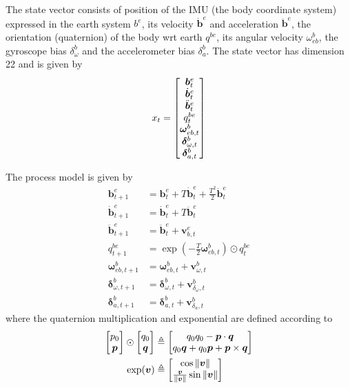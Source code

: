 The state vector consists of position of the IMU (the body coordinate system) expressed in the earth system $ b^{e} $, its velocity $ \dot{\bm{b}}^{e} $ and acceleration $ \ddot{\bm{b}}^{e} $, the orientation (quaternion) of the body wrt earth $ q^{be} $, its angular velocity $ \omega_{eb}^{b} $, the gyroscope bias $ \delta_{\omega}^{b} $ and the accelerometer bias $ \delta_{a}^{b} $. The state vector has dimension 22 and is given by
\begin{equation}\label{eq:state1}
x_{t} = \begin{bmatrix} \bm{b}_{t}^{e} \\ \dot{\bm{b}}_{t}^{e} \\ \ddot{\bm{b}}_{t}^{e} \\ q_{t}^{be} \\ \bm{\omega}_{eb,t}^{b} \\ \bm{\delta}_{\omega,t}^{b} \\ \bm{\delta}_{a,t}^{b} \end{bmatrix}
\end{equation}

The process model is given by
\begin{subequations}\label{eq:procmod1} \begin{align}
	\bm{b}_{t+1}^{e} &= \bm{b}_{t}^{e} + T \dot{\bm{b}}_{t}^{e} + \tfrac {T^{2}} {2} \ddot{\bm{b}}_{t}^{e} \\
	\dot{\bm{b}}_{t+1}^{e} &= \dot{\bm{b}}_{t}^{e} + T \ddot{\bm{b}}_{t}^{e} \\
	\ddot{\bm{b}}_{t+1}^{e} &= \ddot{\bm{b}}_{t}^{e} + \bm{v}_{b,t}^{e} \\
	q_{t+1}^{be} &= \exp( -\tfrac{T}{2} \bm{\omega}_{eb,t}^{b} ) \odot q_{t}^{be} \\
	\bm{\omega}_{eb,t+1}^{b} &= \bm{\omega}_{eb,t}^{b} + \bm{v}_{\omega,t}^{b} \\
	\bm{\delta}_{\omega,t+1}^{b} &= \bm{\delta}_{\omega,t}^{b} + \bm{v}_{\delta_{\omega},t}^{b} \\
	\bm{\delta}_{a,t+1}^{b} &= \bm{\delta}_{a,t}^{b} + \bm{v}_{\delta_{a},t}^{b}
\end{align} \end{subequations}
where the quaternion multiplication and exponential are defined according to
\begin{subequations} \begin{align}
	\begin{bmatrix} p_{0} \\ \bm{p} \end{bmatrix} \odot \begin{bmatrix} q_{0} \\ \bm{q} \end{bmatrix} &\triangleq \begin{bmatrix} q_{0} q_{0} - \bm{p} \cdot \bm{q} \\ q_{0} \bm{q} + q_{0} \bm{p} + \bm{p} \times \bm{q} \end{bmatrix} \\
	\exp( \bm{v} ) &\triangleq \begin{bmatrix} \cos \| \bm{v} \| \\ \tfrac { \bm{v} }{ \| \bm{v} \| } \sin \| \bm{v} \| \end{bmatrix}
\end{align} \end{subequations}

